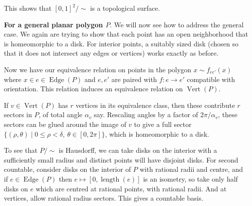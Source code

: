 \begin{example}
\begin{center}
\end{center}


This shows that $[0, 1]^2 / \sim$ is a topological surface.

\textbf{For a general planar polygon $P$}. We will now see how to address the general case.
We again are trying to show that each point has an open neighborhood that is homeomorphic to a disk. For interior points, a suitably sized disk (chosen so that it does not intersect any edges or vertices) works exactly as before.

Now we have our equivalence relation on points in the polygon $x \sim f_{ee'}(x)$ where $x \in e \in \operatorname{Edge}(P)$ and $e, e'$ are paired with $f: e \rightarrow e'$ compatible with orientation. This relation induces an equivalence relation on $\operatorname{Vert}(P)$.

If $v \in \operatorname{Vert}(P)$ has $r$ vertices in its equivalence class, then these contribute $r$ sectors in $P$, of total angle $\alpha_v$ say. Rescaling angles by a factor of $2\pi/\alpha_v$, these sectors can be glued around the image of $v$ to give a full sector $\{(\rho, \theta) \mid 0 \leq \rho < \delta,\ \theta \in [0, 2\pi]\}$, which is homeomorphic to a disk.

To see that $P/\sim$ is Hausdorff, we can take disks on the interior with a sufficiently small radius and distinct points will have disjoint disks. For second countable, consider disks on the interior of $P$ with rational radii and centre, and if $e \in \operatorname{Edge}(P)$ then $e \mapsto [0, \operatorname{length}(e)]$ is an isometry, so take only half disks on $e$ which are centred at rational points, with rational radii. And at vertices, allow rational radius sectors. This gives a countable basis.


\end{example}

